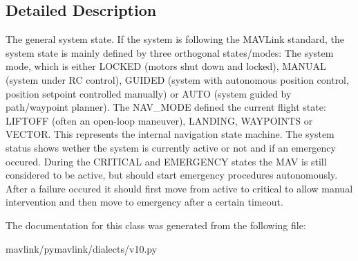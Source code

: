 \subsection{Detailed Description}
\begin{DoxyVerb}The general system state. If the system is following the
MAVLink standard, the system state is mainly defined by three
orthogonal states/modes: The system mode, which is either
LOCKED (motors shut down and locked), MANUAL (system under RC
control), GUIDED (system with autonomous position control,
position setpoint controlled manually) or AUTO (system guided
by path/waypoint planner). The NAV_MODE defined the current
flight state: LIFTOFF (often an open-loop maneuver), LANDING,
WAYPOINTS or VECTOR. This represents the internal navigation
state machine. The system status shows wether the system is
currently active or not and if an emergency occured. During
the CRITICAL and EMERGENCY states the MAV is still considered
to be active, but should start emergency procedures
autonomously. After a failure occured it should first move
from active to critical to allow manual intervention and then
move to emergency after a certain timeout.
\end{DoxyVerb}
 

The documentation for this class was generated from the following file\+:\begin{DoxyCompactItemize}
\item 
mavlink/pymavlink/dialects/v10.\+py\end{DoxyCompactItemize}
